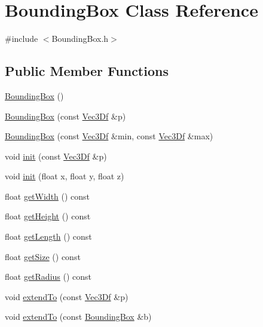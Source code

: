 \hypertarget{class_bounding_box}{
\section{BoundingBox Class Reference}
\label{class_bounding_box}
}


{\ttfamily \#include $<$BoundingBox.h$>$}

\subsection*{Public Member Functions}
\begin{DoxyCompactItemize}
\item 
\hyperlink{class_bounding_box_a6e401c4da5839950f1f30c8b8c4d1208}{BoundingBox} ()
\item 
\hyperlink{class_bounding_box_afcd5c43bf230a10f07e6552c58db967e}{BoundingBox} (const \hyperlink{class_vec3_d}{Vec3Df} \&p)
\item 
\hyperlink{class_bounding_box_a5f44381ea07c9b6f65bae79dada53ce5}{BoundingBox} (const \hyperlink{class_vec3_d}{Vec3Df} \&min, const \hyperlink{class_vec3_d}{Vec3Df} \&max)
\item 
void \hyperlink{class_bounding_box_a0b1b7e15c6b98752179faa396e7896f1}{init} (const \hyperlink{class_vec3_d}{Vec3Df} \&p)
\item 
void \hyperlink{class_bounding_box_abb26b742738d4081aafff2c5436bf226}{init} (float x, float y, float z)
\item 
float \hyperlink{class_bounding_box_acd3378928b8a9996790b22ad9f8b6404}{getWidth} () const 
\item 
float \hyperlink{class_bounding_box_aeb0038310316513e738f712548394d45}{getHeight} () const 
\item 
float \hyperlink{class_bounding_box_a9551e31a1a85d1dcaff9951fb05223e2}{getLength} () const 
\item 
float \hyperlink{class_bounding_box_a8a89e81934b64c21bc4b825b5d695f87}{getSize} () const 
\item 
float \hyperlink{class_bounding_box_a8b43b3ab3ca509d5558b74d7f4899423}{getRadius} () const 
\item 
void \hyperlink{class_bounding_box_a706c118cbc1abea55312761b9096bc00}{extendTo} (const \hyperlink{class_vec3_d}{Vec3Df} \&p)
\item 
void \hyperlink{class_bounding_box_af1d01d2b8b878a43e7eb484a99a54a30}{extendTo} (const \hyperlink{class_bounding_box}{BoundingBox} \&b)
\item 

\end{DoxyCompactItemize}
